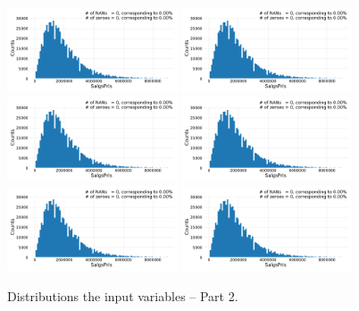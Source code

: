\begin{figure}
  \subfloat{\qquad}
  \includegraphics[draft=false, width=0.45\textwidth, page=19, trim=15 0 15 0, clip]{figures/housing/overview_fig.pdf}\hfil
  \subfloat{\qquad}
  \includegraphics[draft=false, width=0.45\textwidth, page=20, trim=15 0 15 0, clip]{figures/housing/overview_fig.pdf}
  \subfloat{\qquad}
  \includegraphics[draft=false, width=0.45\textwidth, page=21, trim=15 0 15 0, clip]{figures/housing/overview_fig.pdf}\hfil
  \subfloat{\qquad}
  \includegraphics[draft=false, width=0.45\textwidth, page=22, trim=15 0 15 0, clip]{figures/housing/overview_fig.pdf}
  \subfloat{\qquad}
  \includegraphics[draft=false, width=0.45\textwidth, page=23, trim=15 0 15 0, clip]{figures/housing/overview_fig.pdf}\hfil
  \subfloat{\qquad}
  \includegraphics[draft=false, width=0.45\textwidth, page=24, trim=15 0 15 0, clip]{figures/housing/overview_fig.pdf}
  \caption[Distributions of the Input Variables -- Part 2]{Distributions the input variables -- Part 2.}
  \label{fig:h:variable_overview_all_2}
  \vspace{\abovecaptionskip}
\end{figure}

